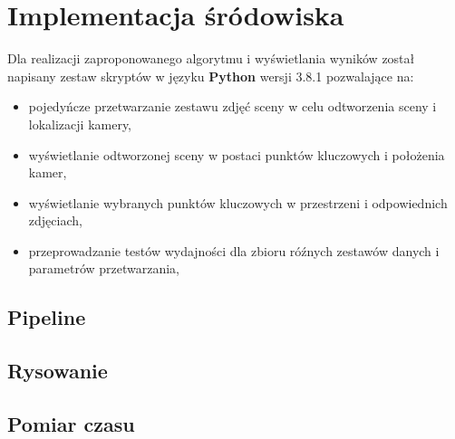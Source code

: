 \section{Implementacja śródowiska}

Dla realizacji zaproponowanego algorytmu i wyświetlania wyników został napisany zestaw skryptów w języku \textbf{Python} wersji 3.8.1 pozwalające na:
\begin{itemize}
   \item pojedyńcze przetwarzanie zestawu zdjęć sceny w celu odtworzenia sceny i lokalizacji kamery,
   \item wyświetlanie odtworzonej sceny w postaci punktów kluczowych i położenia kamer,
   \item wyświetlanie wybranych punktów kluczowych w przestrzeni i odpowiednich zdjęciach,
   \item przeprowadzanie testów wydajności dla zbioru róźnych zestawów danych i parametrów przetwarzania,
\end{itemize}

\subsection{Pipeline}
\subsection{Rysowanie}
\subsection{Pomiar czasu}
